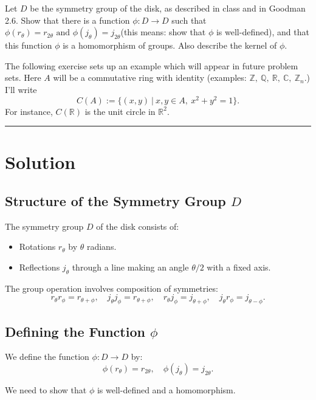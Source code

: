 \documentclass[12pt]{amsart}
\theoremstyle{definition}
\numberwithin{equation}{section}
\newcommand{\Z}{\mathbb{Z}}
\renewcommand{\C}{\mathbb{C}}
\newcommand{\R}{\mathbb{R}}
\newcommand{\Q}{\mathbb{Q}}
\begin{document}
\begin{exercise}{3} Let $D$ be the symmetry group of the disk, as described in class and in Goodman 2.6. Show that there is a function \(\phi:D \rightarrow D\) such that \(\phi(r_\theta)=r_{2\theta} \text{ and } \phi(j_\theta)=j_{2\theta}\)(this means: show that \(\phi\) is well-defined), and that this function \(\phi\) is a homomorphism of groups. Also describe the kernel of \(\phi\).

    The following exercise sets up an example which will appear in future problem sets. Here $A$ will be a commutative ring with identity (examples: \(\Z, \ \Q, \ \R, \ \C, \ \Z_n.\)) I'll write \[C(A):= \{(x,y) \ | \ x,y\in A, \ x^2+y^2=1 \}.\] For instance, \(C(\R)\) is the unit circle in \(\R^2\).
   
    \noindent\rule{\linewidth}{1pt}

    \section*{Solution}

\subsection*{Structure of the Symmetry Group \(D\)}

The symmetry group \(D\) of the disk consists of:
\begin{itemize}
    \item Rotations \(r_\theta\) by \(\theta\) radians.
    \item Reflections \(j_\theta\) through a line making an angle \(\theta/2\) with a fixed axis.
\end{itemize}

The group operation involves composition of symmetries:
\[
r_\theta r_\phi = r_{\theta + \phi}, \quad j_\theta j_\phi = r_{\theta + \phi}, \quad r_\theta j_\phi = j_{\theta + \phi}, \quad j_\theta r_\phi = j_{\theta - \phi}.
\]

\subsection*{Defining the Function \(\phi\)}

We define the function \(\phi: D \rightarrow D\) by:
\[
\phi(r_\theta) = r_{2\theta}, \quad \phi(j_\theta) = j_{2\theta}.
\]

We need to show that \(\phi\) is well-defined and a homomorphism.


\end{exercise}
\end{document}
